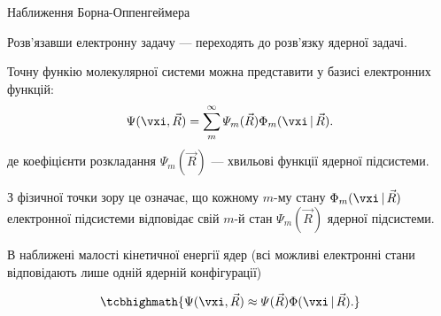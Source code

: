 \documentclass[]{beamer}
\begin{document}
\begin{frame}{Наближення Борна-Оппенгеймера}

	\begin{center}
		Розв'язавши електронну задачу --- переходять до розв'язку ядерної задачі.
	\end{center}


	\begin{exampleblock}{}\scriptsize
		Точну функію молекулярної системи можна представити у базисі електронних функцій:
		\begin{equation*}\label{}
			\Psi(\vxi,\vec{R}) = \sum\limits_m^{\infty} \varPsi_m(\vec{R}) \Phi_m(\vxi\,|\,\vec{R}).
		\end{equation*}
		де коефіцієнти розкладання $\varPsi_m(\vec{R})$ --- хвильові функції ядерної підсистеми.

		З фізичної точки зору це означає, що кожному $m$-му стану $\Phi_m(\vxi\,|\,\vec{R})$ електронної підсистеми відповідає свій $m$-й стан $\varPsi_m(\vec{R})$ ядерної підсистеми.
	\end{exampleblock}


	В наближені малості кінетичної енергії ядер (всі можливі електронні стани відповідають лише одній ядерній конфігурації)

	\begin{equation*}\label{}
		\tcbhighmath{\Psi(\vxi,\vec{R}) \approx \varPsi (\vec{R}) \Phi (\vxi\,|\,\vec{R}).}
	\end{equation*}


\end{frame}
\end{document}
